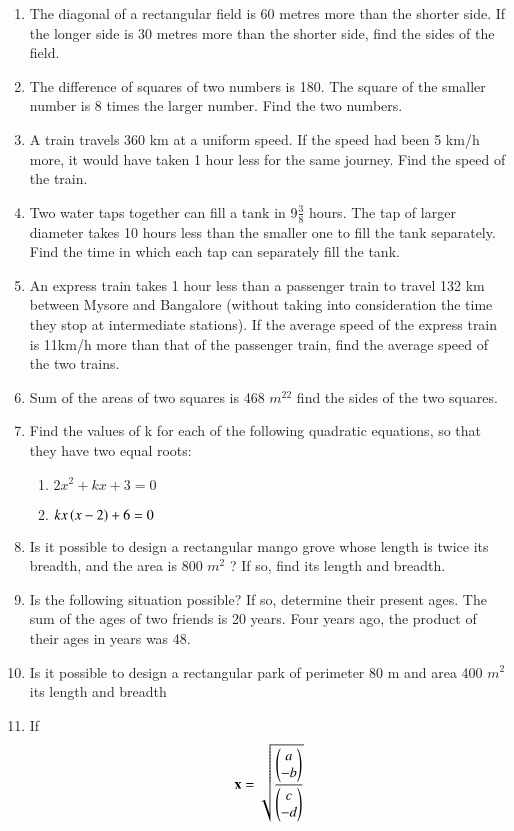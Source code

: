 \begin{enumerate}[label=\arabic*.,ref=\thesubsection.\theenumi]
\item The diagonal of a rectangular field is 60 metres more than the shorter side. If the longer side is 30 metres more than the shorter side, find the sides of the field.
\item The difference of squares of two numbers is 180. The square of the smaller number is 8 times the larger number. Find the two numbers.
\item A train travels 360 km at a uniform speed. If the speed had been 5 km/h more, it would have taken 1 hour less for the same journey. Find the speed of the train.
\item Two water taps together can fill a tank in 9$\frac{3}{ 8}$
hours. The tap of larger diameter takes 10
hours less than the smaller one to fill the tank separately. Find the time in which each tap can separately fill the tank.
\item An express train takes 1 hour less than a passenger train to travel 132 km between Mysore and Bangalore (without taking into consideration the time they stop at intermediate stations). If the average speed of the express train is 11km/h more than that of the passenger train, find the average speed of the two trains.
\item Sum of the areas of two squares is 468 $m^22$ find the sides of the two squares.
\item Find the values of k for each of the following quadratic equations, so that they have two equal roots:
\begin{enumerate}
\item 	$2x^2+kx+3 = 0$
\item 	$kx\left(x-2\right)+6= 0$
\end{enumerate}
\item Is it possible to design a rectangular mango grove whose length is twice its breadth, and the area is 800 $m^2$
? If so, find its length and breadth.
\item Is the following situation possible? If so, determine their present ages. The sum of the ages of two friends is 20 years. Four years ago, the product of their ages in years was 48.
\item Is it possible to design a rectangular park of perimeter 80 m and area 400 $m^2$ its length and breadth
\item If 
%
\begin{align}
\mathbf{x} = \sqrt{
\frac{\begin{pmatrix}a\\-b\end{pmatrix}}{\begin{pmatrix}c\\-d\end{pmatrix}}
}
\end{align}

\end{enumerate}
